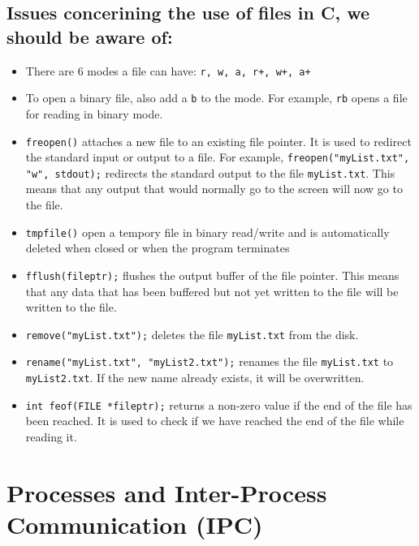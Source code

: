\documentclass[a4paper, 10pt]{article}
\begin{document}
\subsection{Issues concerining the use of files in C, we should be aware of:}
\begin{itemize}
    \item There are 6 modes a file can have: \texttt{r, w, a, r+, w+, a+}
    \item To open a binary file, also add a \texttt{b} to the mode. For example, \texttt{rb} opens a file for reading in binary mode.
    \item \texttt{freopen()} attaches a new file to an existing file pointer. It is used to redirect the standard input or output to a file. For example, \texttt{freopen("myList.txt", "w", stdout);} redirects the standard output to the file \texttt{myList.txt}. This means that any output that would normally go to the screen will now go to the file.
    \item \texttt{tmpfile()} open a tempory file in binary read/write and is automatically deleted when closed or when the program terminates
    \item \texttt{fflush(fileptr);} flushes the output buffer of the file pointer. This means that any data that has been buffered but not yet written to the file will be written to the file.
    \item \texttt{remove("myList.txt");} deletes the file \texttt{myList.txt} from the disk.
    \item \texttt{rename("myList.txt", "myList2.txt");} renames the file \texttt{myList.txt} to \texttt{myList2.txt}. If the new name already exists, it will be overwritten.
    \item \texttt{int feof(FILE *fileptr);} returns a non-zero value if the end of the file has been reached. It is used to check if we have reached the end of the file while reading it.
\end{itemize}
\section{Processes and Inter-Process Communication (IPC)}
\end{document}
